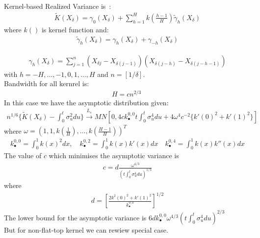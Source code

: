 \documentclass[letterpaper]{report}
\newcounter{N}
\begin{document}
Kernel-based Realized Variance is~\cite[Barndorff-Nielsen et al., 2006]{BarndorffNielsen_Hansen_Lunde_Shephard}:
\begin{gather}
\tilde{K}(X_{\delta})=\gamma_0 (X_{\delta})+ \sum_{h=1}^H k\left(\frac{h-1}{H}\right)\tilde{\gamma}_h(X_{\delta})
\end{gather}
\noindent where $k()$ is kernel function and:
\begin{gather}
\tilde{\gamma}_h (X_{\delta}) = \gamma_h (X_\delta) + \gamma_{-h}(X_{\delta})
\end{gather}

\begin{gather}
\gamma_h (X_{\delta}) = \sum_{j=1}^n (X_{\delta j} - X_{\delta (j-1)})(X_{\delta (j-h)}-X_{\delta (j-h-1)})
\end{gather}
\noindent with $h = -H, \ldots, -1,0,1, \ldots, H$ and $n = [1/\delta]$.\\

\noindent Bandwidth for all kernrel is:
\begin{gather}
H = cn^{2/3}\;
\end{gather}
\noindent In this case we have the asymptotic distribution given:
\begin{gather}
n^{1/6}\{\tilde{K}(X_{\delta}) - \int_0^t \sigma_u^2 du\}\stackrel{L_s}{\to} MN \left[0,4 ck^{0,0}_{\bullet} t \int_0^t \sigma_u^4 du + 4\omega^4 c^{-2} \{k'(0)^2 + k'(1)^2\}\right] 
\end{gather}
\noindent where $\omega = (1,1,k(\frac{1}{H}), \ldots, k\left(\frac{H-1}{H}\right))^T$
\begin{gather}
k_{\bullet}^{0,0} = \int_0^1 k(x)^2 dx, \quad k_{\bullet}^{0,2} = \int_0^1 k(x)k'(x) dx \quad k_{\bullet}^{0,4} = \int_0^1 k(x)k''(x) dx
\end{gather}
\noindent The value of $c$ which minimises the asymptotic variance is
\begin{gather}
c = d \frac {\omega^{4/3}}{(t\int_0^t \sigma_u^4 du)^{1/3}}
\end{gather}
\noindent where
\begin{gather}
d = \left[\frac{2{k^2(0)^2+k'(1)^2}}{k_{\bullet}^{0,0}}\right]^{1/2}
\end{gather}
\noindent The lower bound for the asymptotic variance is $6 dk_{\bullet}^{0,0}
\omega^{4/3} (t \int_0^t \sigma_u^4 du)^{2/3}$\\

\noindent But for non-flat-top kernel we can rewiew special case.\\
\end{document}
